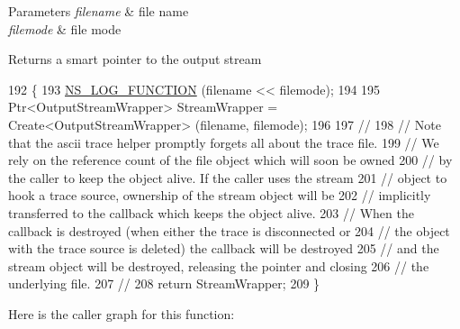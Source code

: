 \begin{DoxyParams}{Parameters}
{\em filename} & file name \\
\hline
{\em filemode} & file mode \\
\hline
\end{DoxyParams}
\begin{DoxyReturn}{Returns}
a smart pointer to the output stream 
\end{DoxyReturn}

\begin{DoxyCode}
192 \{
193   \hyperlink{log-macros-disabled_8h_a90b90d5bad1f39cb1b64923ea94c0761}{NS\_LOG\_FUNCTION} (filename << filemode);
194 
195   Ptr<OutputStreamWrapper> StreamWrapper = Create<OutputStreamWrapper> (filename, filemode);
196 
197   \textcolor{comment}{//}
198   \textcolor{comment}{// Note that the ascii trace helper promptly forgets all about the trace file.}
199   \textcolor{comment}{// We rely on the reference count of the file object which will soon be owned}
200   \textcolor{comment}{// by the caller to keep the object alive.  If the caller uses the stream }
201   \textcolor{comment}{// object to hook a trace source, ownership of the stream object will be}
202   \textcolor{comment}{// implicitly transferred to the callback which keeps the object alive.}
203   \textcolor{comment}{// When the callback is destroyed (when either the trace is disconnected or}
204   \textcolor{comment}{// the object with the trace source is deleted) the callback will be destroyed}
205   \textcolor{comment}{// and the stream object will be destroyed, releasing the pointer and closing}
206   \textcolor{comment}{// the underlying file.}
207   \textcolor{comment}{//}
208   \textcolor{keywordflow}{return} StreamWrapper;
209 \}
\end{DoxyCode}


Here is the caller graph for this function\+:


